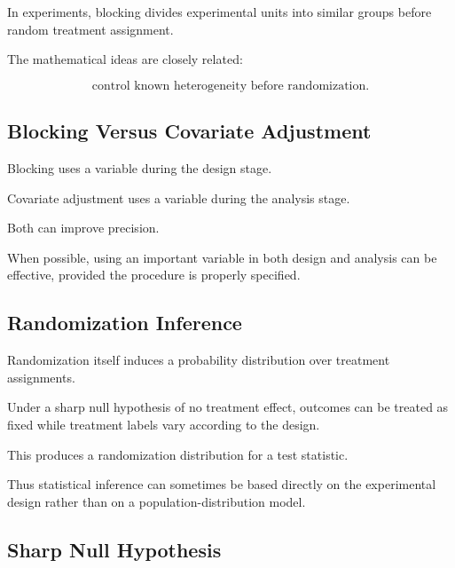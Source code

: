 In experiments, blocking divides experimental units into similar groups
before random treatment assignment.

The mathematical ideas are closely related:

\[
\boxed{
\text{control known heterogeneity before randomization}.
}
\]

\subsection{Blocking Versus Covariate Adjustment}
\label{subsec:blocking-versus-covariate-adjustment}

Blocking uses a variable during the design stage.

Covariate adjustment uses a variable during the analysis stage.

Both can improve precision.

When possible, using an important variable in both design and analysis
can be effective, provided the procedure is properly specified.

\subsection{Randomization Inference}
\label{subsec:randomization-inference-design}

Randomization itself induces a probability distribution over treatment
assignments.

Under a sharp null hypothesis of no treatment effect, outcomes can be
treated as fixed while treatment labels vary according to the design.

This produces a randomization distribution for a test statistic.

Thus statistical inference can sometimes be based directly on the
experimental design rather than on a population-distribution model.

\subsection{Sharp Null Hypothesis}
\label{subsec:sharp-null-hypothesis}


